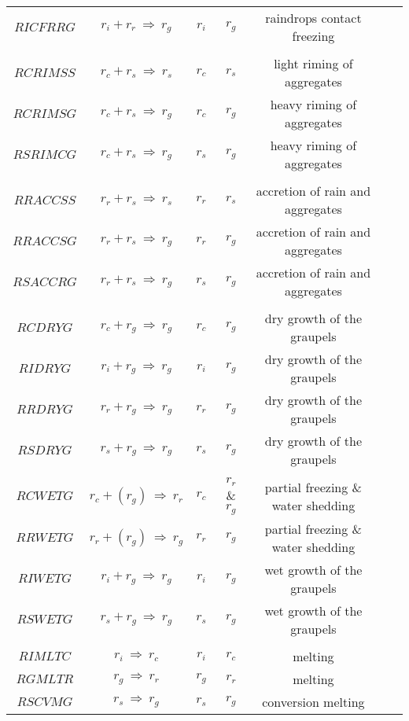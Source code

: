 \begin{table}[!ht]
\begin{center}
\begin{tabular}{|c|c|c|c|c|c|c|}
$RICFRRG$ & $r_i+r_r\ \Longrightarrow \ r_g$ & $r_i$ & $r_g$ & raindrops contact freezing \\
 & & & & \\
$RCRIMSS$ & $r_c+r_s\ \Longrightarrow \ r_s$ & $r_c$ & $r_s$ & light riming of aggregates \\
$RCRIMSG$ & $r_c+r_s\ \Longrightarrow \ r_g$ & $r_c$ & $r_g$ & heavy riming of aggregates \\
$RSRIMCG$ & $r_c+r_s\ \Longrightarrow \ r_g$ & $r_s$ & $r_g$ & heavy riming of aggregates \\
 & & & & \\
$RRACCSS$ & $r_r+r_s\ \Longrightarrow \ r_s$ & $r_r$ & $r_s$ & accretion of rain and aggregates \\
$RRACCSG$ & $r_r+r_s\ \Longrightarrow \ r_g$ & $r_r$ & $r_g$ & accretion of rain and aggregates \\
$RSACCRG$ & $r_r+r_s\ \Longrightarrow \ r_g$ & $r_s$ & $r_g$ & accretion of rain and aggregates \\
 & & & & \\
$RCDRYG$ & $r_c+r_g\ \Longrightarrow \ r_g$ & $r_c$ & $r_g$ & dry growth of the graupels \\
$RIDRYG$ & $r_i+r_g\ \Longrightarrow \ r_g$ & $r_i$ & $r_g$ & dry growth of the graupels \\
$RRDRYG$ & $r_r+r_g\ \Longrightarrow \ r_g$ & $r_r$ & $r_g$ & dry growth of the graupels \\
$RSDRYG$ & $r_s+r_g\ \Longrightarrow \ r_g$ & $r_s$ & $r_g$ & dry growth of the graupels \\
 & & & & \\
$RCWETG$ & $r_c+(r_g)\ \Longrightarrow \ r_r$ & $r_c$ & $r_r$ \& $r_g$ & partial freezing \& water shedding \\
$RRWETG$ & $r_r+(r_g)\ \Longrightarrow \ r_g$ & $r_r$ & $r_g$ & partial freezing
\& water shedding \\
$RIWETG$ & $r_i+r_g\ \Longrightarrow \ r_g$ & $r_i$ & $r_g$ & wet growth of the graupels \\
$RSWETG$ & $r_s+r_g\ \Longrightarrow \ r_g$ & $r_s$ & $r_g$ & wet growth of the graupels \\
 & & & & \\
$RIMLTC$ & $r_i\ \Longrightarrow \ r_c$ & $r_i$ & $r_c$ & melting \\
$RGMLTR$ & $r_g\ \Longrightarrow \ r_r$ & $r_g$ & $r_r$ & melting \\
$RSCVMG$ & $r_s\ \Longrightarrow \ r_g$ & $r_s$ & $r_g$ & conversion melting \\
\hline
\end{tabular}
\end{center}
\end{table}

